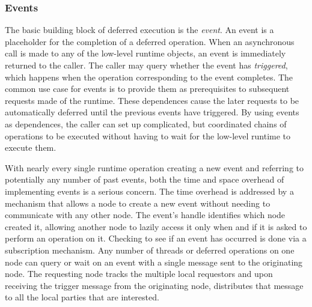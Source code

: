 \subsubsection{Events}
\label{subsec:events}
The basic building block of deferred execution 
is the {\em event}.  An event is a placeholder for the completion of a deferred
operation.  When an asynchronous call is made to any of the low-level runtime objects, an event is 
immediately returned to the caller.  The caller may query whether the event has {\em triggered},
which happens when the operation corresponding to the event completes.  The common use case for events is
to provide them as prerequisites to subsequent requests made of the runtime. 
These dependences cause the later requests to be automatically deferred until the previous
events have triggered.  By using events as dependences, the caller can
set up complicated, but coordinated chains of operations to be executed without
having to wait for the low-level runtime to execute them.

With nearly every single runtime operation creating a new event and referring
to potentially any number of past events, both the time and space overhead of
implementing events is a serious concern.  The time overhead is addressed by a
mechanism that allows a node to create a new event without needing to
communicate with any other node.  The event's handle identifies which node
created it, allowing another node to lazily access it only when and if it 
is asked to perform an operation on it.  Checking to see if an event has
occurred is done via a subscription mechanism.  Any number of threads or
deferred operations on one node can query or wait on an event with a single
message sent to the originating node.  The requesting node tracks the multiple
local requestors and upon receiving the trigger message from the originating
node, distributes that message to all the local parties that are interested.

